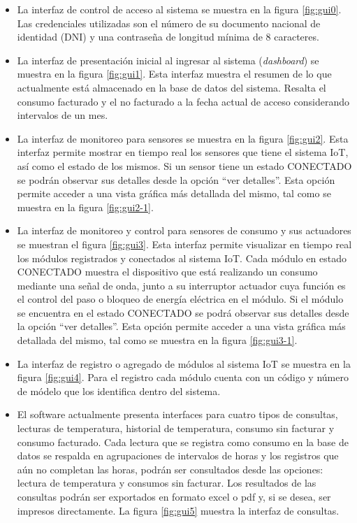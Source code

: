 \begin{itemize}
\item La interfaz de control de acceso al sistema se muestra en la figura \ref{fig:gui0}. Las credenciales utilizadas son el número de su documento nacional de identidad (DNI) y una contraseña de longitud mínima de 8 caracteres.

\item La interfaz de presentación inicial al ingresar al sistema (\emph{dashboard}) se muestra en la figura \ref{fig:gui1}. Esta interfaz muestra el resumen de lo que actualmente está almacenado en la base de datos del sistema. Resalta el consumo facturado y el no facturado a la fecha actual de acceso considerando intervalos de un mes.

\item La interfaz de monitoreo para sensores se muestra en la figura \ref{fig:gui2}. Esta interfaz permite mostrar en tiempo real los sensores que tiene el sistema IoT, así como el estado de los mismos. Si un sensor tiene un estado CONECTADO se podrán observar sus detalles desde la opción ``ver detalles''. Esta opción permite acceder a una vista gráfica más detallada del mismo, tal como se muestra en la figura \ref{fig:gui2-1}.

\item La interfaz de monitoreo y control para sensores de consumo y sus actuadores se muestran el figura \ref{fig:gui3}. Esta interfaz permite visualizar en tiempo real los módulos registrados y conectados al sistema IoT. Cada módulo en estado CONECTADO muestra el dispositivo que está realizando un consumo mediante una señal de onda, junto a su interruptor actuador cuya función es el control del paso o bloqueo de energía eléctrica en el módulo. Si el módulo se encuentra en el estado CONECTADO se podrá observar sus detalles desde la opción ``ver detalles''. Esta opción permite acceder a una vista gráfica más detallada del mismo, tal como se muestra en la figura \ref{fig:gui3-1}.

\item La interfaz de registro o agregado de módulos al sistema IoT se muestra en la figura \ref{fig:gui4}. Para el registro cada módulo cuenta con un código y número de módelo que los identifica dentro del sistema.

\item El software actualmente presenta interfaces para cuatro tipos de consultas, lecturas de temperatura, historial de temperatura, consumo sin facturar y consumo facturado. Cada lectura que se registra como consumo en la base de datos se respalda en agrupaciones de intervalos de horas y los registros que aún no completan las horas, podrán ser consultados desde las opciones: lectura de temperatura y consumos sin facturar. Los resultados de las consultas podrán ser exportados en formato excel o pdf y, si se desea, ser impresos directamente. La figura \ref{fig:gui5} muestra la interfaz de consultas.


\end{itemize}
